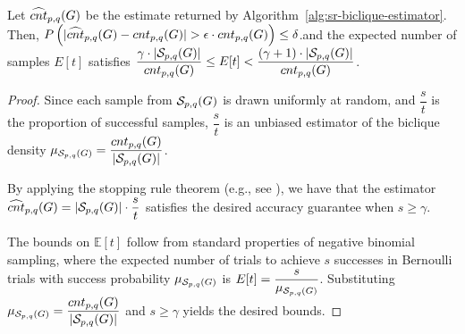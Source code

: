 \begin{theorem}
	Let $ {\widehat{cnt}_{p,q}(G) } $ be the estimate returned by Algorithm~\ref{alg:sr-biclique-estimator}. Then, $P\left( |{\widehat{cnt}_{p,q}(G) } - {cnt_{p,q}(G) }| > \epsilon \cdot {cnt_{p,q}(G) } \right) \leq \delta$.and the expected number of samples $ E[t] $ satisfies $\dfrac{\gamma \cdot |\mathcal{S}_{p,q}(G)|}{{cnt_{p,q}(G) }} \leq E[t] < \dfrac{(\gamma + 1) \cdot |\mathcal{S}_{p,q}(G)|}{{cnt_{p,q}(G) }}$.

\end{theorem}

\begin{proof}
Since each sample from $ \mathcal{S}_{p,q}(G) $ is drawn uniformly at random, and $\dfrac{s}{t} $ is the proportion of successful samples, $\dfrac{s}{t}$ is an unbiased estimator of the biclique density $ \mu_{\mathcal{S}_{p,q}(G)} = \dfrac{{cnt_{p,q}(G) }}{|\mathcal{S}_{p,q}(G)|} $.

By applying the stopping rule theorem (e.g., see \cite{stoppingrule}), we have that the estimator $ {\widehat{cnt}_{p,q}(G) } = |\mathcal{S}_{p,q}(G)| \cdot \dfrac{s}{t} $ satisfies the desired accuracy guarantee when $ s \geq \gamma $.

The bounds on $ \mathbb{E}[t] $ follow from standard properties of negative binomial sampling, where the expected number of trials to achieve $ s $ successes in Bernoulli trials with success probability $ \mu_{\mathcal{S}_{p,q}(G)} $ is $ E[t] = \dfrac{s}{\mu_{\mathcal{S}_{p,q}(G)}} $. Substituting $ \mu_{\mathcal{S}_{p,q}(G)} = \dfrac{{cnt_{p,q}(G) }}{|\mathcal{S}_{p,q}(G)|} $ and $ s \geq \gamma $ yields the desired bounds.

\end{proof}

%
%
%

